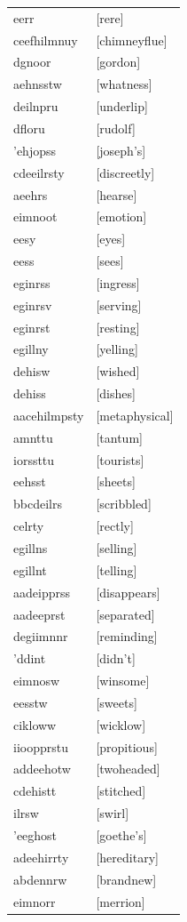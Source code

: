 \documentclass{article}
\begin{document}
\begin{tabular}{ll}
eerr & [rere] \\
ceefhilmnuy & [chimneyflue] \\
dgnoor & [gordon] \\
aehnsstw & [whatness] \\
deilnpru & [underlip] \\
dfloru & [rudolf] \\
'ehjopss & [joseph's] \\
cdeeilrsty & [discreetly] \\
aeehrs & [hearse] \\
eimnoot & [emotion] \\
eesy & [eyes] \\
eess & [sees] \\
eginrss & [ingress] \\
eginrsv & [serving] \\
eginrst & [resting] \\
egillny & [yelling] \\
dehisw & [wished] \\
dehiss & [dishes] \\
aacehilmpsty & [metaphysical] \\
amnttu & [tantum] \\
iorssttu & [tourists] \\
eehsst & [sheets] \\
bbcdeilrs & [scribbled] \\
celrty & [rectly] \\
egillns & [selling] \\
egillnt & [telling] \\
aadeipprss & [disappears] \\
aadeeprst & [separated] \\
degiimnnr & [reminding] \\
'ddint & [didn't] \\
eimnosw & [winsome] \\
eesstw & [sweets] \\
cikloww & [wicklow] \\
iioopprstu & [propitious] \\
addeehotw & [twoheaded] \\
cdehistt & [stitched] \\
ilrsw & [swirl] \\
'eeghost & [goethe's] \\
adeehirrty & [hereditary] \\
abdennrw & [brandnew] \\
eimnorr & [merrion] \\

\end{tabular}
\end{document}
